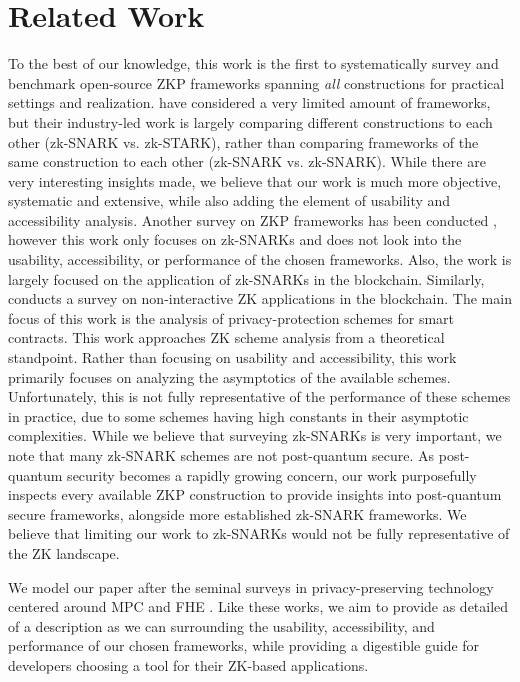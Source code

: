 \section{Related Work}
To the best of our knowledge, this work is the first to systematically survey and benchmark open-source ZKP frameworks spanning \textit{all} constructions for practical settings and realization. \cite{CelerNetwork2023Pantheon, Delendum2023ZKSystemBenchmarking} have considered a very limited amount of frameworks, but their industry-led work is largely comparing different constructions to each other (zk-SNARK vs. zk-STARK), rather than comparing frameworks of the same construction to each other (zk-SNARK vs. zk-SNARK). While there are very interesting insights made, we believe that our work is much more objective, systematic and extensive, while also adding the element of usability and accessibility analysis.
Another survey on ZKP frameworks has been conducted \cite{9520375}, however this work only focuses on zk-SNARKs and does not look into the usability, accessibility, or performance of the chosen frameworks. Also, the work is largely focused on the application of zk-SNARKs in the blockchain. Similarly, \cite{partala2020non} conducts a survey on non-interactive ZK applications in the blockchain. The main focus of this work is the analysis of privacy-protection schemes for smart contracts. This work approaches ZK scheme analysis from a theoretical standpoint. Rather than focusing on usability and accessibility, this work primarily focuses on analyzing the asymptotics of the available schemes. Unfortunately, this is not fully representative of the performance of these schemes in practice, due to some schemes having high constants in their asymptotic complexities. While we believe that surveying zk-SNARKs is very important, we note that many zk-SNARK schemes are not post-quantum secure. As post-quantum security becomes a rapidly growing concern, our work purposefully inspects every available ZKP construction to provide insights into post-quantum secure frameworks, alongside more established zk-SNARK frameworks. We believe that limiting our work to zk-SNARKs would not be fully representative of the ZK landscape.

We model our paper after the seminal surveys in privacy-preserving technology centered around MPC \cite{hastings2019sok} and FHE \cite{viand2021sok}. 
Like these works, we aim to provide as detailed of a description as we can surrounding the usability, accessibility, and performance of our chosen frameworks, while providing a digestible guide for developers choosing a tool for their ZK-based applications.